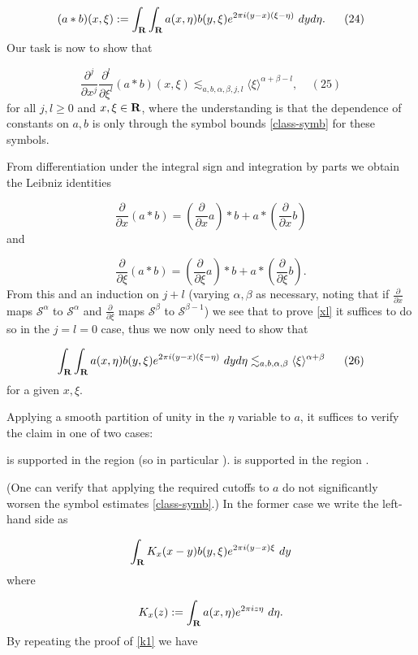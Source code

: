 \documentclass[11pt]{article}
\theoremstyle{definition}
\theoremstyle{remark}
\begin{document}
\[\displaystyle  (a \ast b)(x,\xi) := \int_{\bf R} \int_{\bf R} a(x,\eta) b(y,\xi) e^{2\pi i (y-x)(\xi-\eta)}\ dy d\eta. \ \ \ \ \ (24)\]
 Our task is now to show that \label{xl}

\[\displaystyle  \frac{\partial^j}{\partial x^j} \frac{\partial^l}{\partial \xi^l} (a \ast b)(x,\xi) \lesssim_{a,b,\alpha,\beta,j,l} \langle \xi \rangle^{\alpha+\beta-l}, \ \ \ \ \ (25)\]
 for all \({j,l \geq 0}\) and \({x,\xi \in {\bf R}}\), where the understanding is that the dependence of constants on \({a,b}\) is only through the symbol bounds \eqref{class-symb} for these symbols.


From differentiation under the integral sign and integration by parts we obtain the Leibniz identities 

\[\displaystyle  \frac{\partial}{\partial x} (a \ast b) = (\frac{\partial}{\partial x} a) \ast b + a \ast (\frac{\partial}{\partial x} b)\]
 and 

\[\displaystyle  \frac{\partial}{\partial \xi} (a \ast b) = (\frac{\partial}{\partial \xi} a) \ast b + a \ast (\frac{\partial}{\partial \xi} b).\]
 From this and an induction on \({j+l}\) (varying \({\alpha,\beta}\) as necessary, noting that if \({\frac{\partial}{\partial x}}\) maps \({{\mathcal S}^\alpha}\) to \({{\mathcal S}^\alpha}\) and \({\frac{\partial}{\partial \xi}}\) maps \({{\mathcal S}^\beta}\) to \({{\mathcal S}^{\beta-1}}\)) we see that to prove \eqref{xl} it suffices to do so in the \({j=l=0}\) case, thus we now only need to show that \label{yo}

\[\displaystyle  \int_{\bf R} \int_{\bf R} a(x,\eta) b(y,\xi) e^{2\pi i (y-x)(\xi-\eta)}\ dy d\eta \lesssim_{a,b,\alpha,\beta} \langle \xi \rangle^{\alpha+\beta} \ \ \ \ \ (26)\]
 for a given \({x,\xi}\).


Applying a smooth partition of unity in the \({\eta}\) variable to \({a}\), it suffices to verify the claim in one of two cases: 


  is supported in the region  (so in particular ). 
  is supported in the region .


 (One can verify that applying the required cutoffs to \({a}\) do not significantly worsen the symbol estimates \eqref{class-symb}.) In the former case we write the left-hand side as 

\[\displaystyle  \int_{\bf R} K_x(x-y) b(y,\xi) e^{2\pi i (y-x)\xi}\ dy\]
 where 

\[\displaystyle  K_x(z) := \int_{\bf R} a(x,\eta) e^{2\pi i z \eta}\ d\eta.\]
 By repeating the proof of \eqref{k1} we have 
\end{document}
